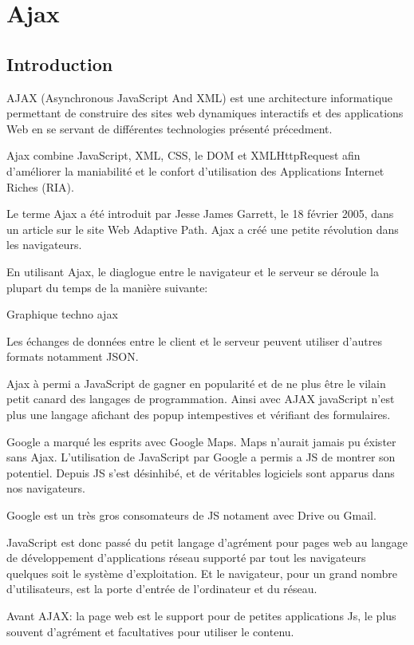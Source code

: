 \chapter{Ajax}
\label{ch:ajax}

\section*{Introduction}

AJAX (Asynchronous JavaScript And XML) est une architecture informatique permettant de construire des sites web dynamiques interactifs et des applications Web en se servant de différentes technologies présenté précedment.

Ajax combine JavaScript, XML, CSS, le DOM et XMLHttpRequest afin d’améliorer la maniabilité et le confort d’utilisation des Applications Internet Riches (RIA).

Le terme Ajax a été introduit par Jesse James Garrett, le 18 février 2005, dans un article sur le site Web Adaptive Path. Ajax a créé une petite révolution dans les navigateurs.

En utilisant Ajax, le diaglogue entre le navigateur et le serveur se déroule la plupart du temps de la manière suivante:

 
Graphique techno ajax

Les échanges de données entre le client et le serveur peuvent utiliser d’autres formats notamment JSON.

Ajax à permi a JavaScript de gagner en popularité et de ne plus être le vilain petit canard des langages de programmation. Ainsi avec AJAX javaScript n’est plus une langage afichant des popup intempestives et vérifiant des formulaires.

Google a marqué les esprits avec Google Maps. Maps n’aurait jamais pu éxister sans Ajax. L’utilisation de JavaScript par Google a permis a JS de montrer son potentiel. Depuis JS s’est désinhibé, et de véritables logiciels sont apparus dans nos navigateurs.

Google est un très gros consomateurs de JS notament avec Drive ou Gmail.

JavaScript est donc passé du petit langage d’agrément pour pages web au langage de développement d’applications réseau supporté par tout les navigateurs quelques soit le système d’exploitation. Et le navigateur, pour un grand nombre d’utilisateurs, est la porte d’entrée de l’ordinateur et du réseau.

Avant AJAX: la page web est le support pour de petites applications Js, le plus souvent d’agrément et facultatives pour utiliser le contenu.

